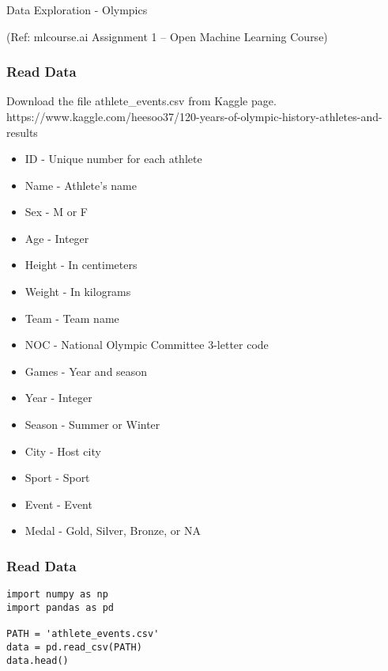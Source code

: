 \begin{frame}[fragile]\frametitle{}
\begin{center}
{\Large Data Exploration - Olympics}
\end{center}

{\tiny (Ref: mlcourse.ai Assignment 1 – Open Machine Learning Course)}
\end{frame}

\begin{frame}[fragile]\frametitle{Read Data}	
Download the file athlete\_events.csv from Kaggle page. 
https://www.kaggle.com/heesoo37/120-years-of-olympic-history-athletes-and-results

\tiny 
\begin{itemize}
\item ID - Unique number for each athlete
\item Name - Athlete's name
\item Sex - M or F
\item Age - Integer
\item Height - In centimeters
\item Weight - In kilograms
\item Team - Team name
\item NOC - National Olympic Committee 3-letter code
\item Games - Year and season
\item Year - Integer
\item Season - Summer or Winter
\item City - Host city
\item Sport - Sport
\item Event - Event
\item Medal - Gold, Silver, Bronze, or NA
\end{itemize}

\end{frame}

\begin{frame}[fragile]\frametitle{Read Data}	
\begin{lstlisting}
import numpy as np
import pandas as pd

PATH = 'athlete_events.csv'
data = pd.read_csv(PATH)
data.head()
\end{lstlisting}

\end{frame}

